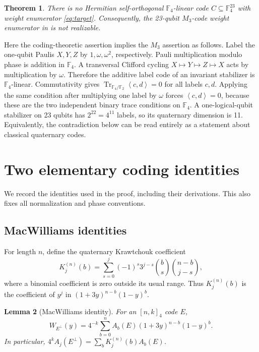 \documentclass[11pt]{article}
\newtheorem{theorem}{Theorem}[section]
\newtheorem{lemma}[theorem]{Lemma}
\theoremstyle{remark}
\newcommand{\F}{\mathbb F_4}
\newcommand{\tr}{\operatorname{Tr}}
\newcommand{\ip}[2]{\left\langle #1,#2\right\rangle}
\begin{document}
\begin{theorem}\label{thm:main}
There is no Hermitian self-orthogonal $\F$-linear code
$C\subseteq\F^{23}$ with weight enumerator \eqref{eq:target}.
Consequently, the 23-qubit $M_3$-code weight enumerator in
\cite[equation (B.2)]{KP} is not realizable.
\end{theorem}

Here the coding-theoretic assertion implies the $M_3$ assertion as follows.
Label the one-qubit Paulis $X,Y,Z$ by $1,\omega,\omega^2$, respectively.
Pauli multiplication modulo phase is addition in $\F$.  A transversal
Clifford cycling $X\mapsto Y\mapsto Z\mapsto X$ acts by multiplication
by $\omega$.  Therefore the additive label code of an invariant stabilizer
is $\F$-linear.  Commutativity gives
$\tr_{\F/\mathbb F_2}\ip{c}{d}=0$ for all labels $c,d$.  Applying the
same condition after multiplying one label by $\omega$ forces
$\ip{c}{d}=0$, because these are the two independent binary trace
conditions on $\F$.  A one-logical-qubit stabilizer on 23 qubits has
$2^{22}=4^{11}$ labels, so its quaternary dimension is 11.
Equivalently, the contradiction below can be read entirely as a statement
about classical quaternary codes.

\section{Two elementary coding identities}

We record the identities used in the proof, including their derivations.
This also fixes all normalization and phase conventions.

\subsection{MacWilliams identities}

For length $n$, define the quaternary Krawtchouk coefficient
\begin{equation}
 K_j^{(n)}(b)=
 \sum_{s=0}^{j}(-1)^s3^{j-s}
     \binom{b}{s}\binom{n-b}{j-s},
 \label{eq:krawtchouk}
\end{equation}
where a binomial coefficient is zero outside its usual range.  Thus
$K_j^{(n)}(b)$ is the coefficient of $y^j$ in
$(1+3y)^{n-b}(1-y)^b$.

\begin{lemma}[MacWilliams identity]\label{lem:macwilliams}
For an $[n,k]_4$ code $E$,
\begin{equation}
 W_{E^\perp}(y)=4^{-k}
 \sum_{b=0}^n A_b(E)(1+3y)^{n-b}(1-y)^b.
 \label{eq:macwilliams}
\end{equation}
In particular,
$4^k A_j(E^\perp)=\sum_b K_j^{(n)}(b)A_b(E)$.
\end{lemma}
\end{document}
